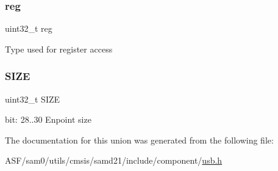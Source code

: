 \subsubsection{\texorpdfstring{reg}{reg}}
{\footnotesize\ttfamily uint32\+\_\+t reg}

Type used for register access \mbox{\label{union_u_s_b___d_e_v_i_c_e___p_c_k_s_i_z_e___type_a8aff32858d38b4e185cc0bfcb3926c04}} 
\subsubsection{\texorpdfstring{SIZE}{SIZE}}
{\footnotesize\ttfamily uint32\+\_\+t S\+I\+ZE}

bit\+: 28..30 Enpoint size 

The documentation for this union was generated from the following file\+:\begin{DoxyCompactItemize}
\item 
A\+S\+F/sam0/utils/cmsis/samd21/include/component/\mbox{\hyperlink{component_2usb_8h}{usb.\+h}}\end{DoxyCompactItemize}

